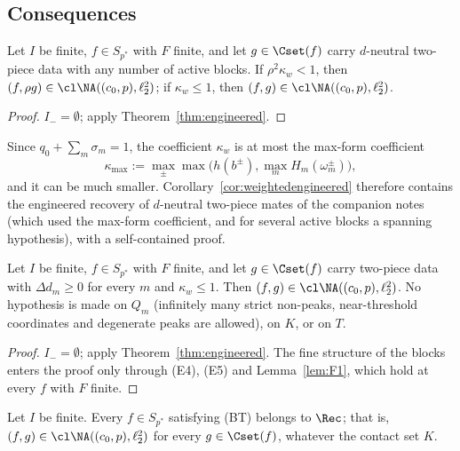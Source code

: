 
\subsection{Consequences}

\begin{corollary}\label{cor:weightedengineered}
Let $I$ be finite, $f\in S_{p^*}$ with $F$ finite, and let $g\in\Cset(f)$
carry $d$-neutral two-piece data with any number of active blocks.  If
$\rho^2\kappa_w<1$, then $(f,\rho g)\in\cl\NA((c_0,p),\ell_2^2)$; if
$\kappa_w\le1$, then $(f,g)\in\cl\NA((c_0,p),\ell_2^2)$.
\end{corollary}

\begin{proof}
$I_-=\emptyset$; apply Theorem~\ref{thm:engineered}.
\end{proof}

Since $q_0+\sum_m\sigma_m=1$, the coefficient $\kappa_w$ is at most the
max-form coefficient
\[
 \kappa_{\max}:=\max_\pm\max\big(h(b^\pm),\max_mH_m(\omega^\pm_m)\big),
\]
and it can be much smaller.  Corollary~\ref{cor:weightedengineered} therefore contains the
engineered recovery of $d$-neutral two-piece mates of the companion notes
(which used the max-form coefficient, and for several active blocks a
spanning hypothesis), with a self-contained proof.

\begin{corollary}\label{cor:D1}
Let $I$ be finite, $f\in S_{p^*}$ with $F$ finite, and let $g\in\Cset(f)$
carry two-piece data with $\Delta d_m\ge0$ for every $m$ and $\kappa_w\le1$.
Then $(f,g)\in\cl\NA((c_0,p),\ell_2^2)$.  No hypothesis is made on $Q_m$
\textup{(}infinitely many strict non-peaks, near-threshold coordinates and
degenerate peaks are allowed\textup{)}, on $K$, or on $T$.
\end{corollary}

\begin{proof}
$I_-=\emptyset$; apply Theorem~\ref{thm:engineered}.  The fine structure of
the blocks enters the proof only through (E4), (E5) and
Lemma~\ref{lem:F1}, which hold at every $f$ with $F$ finite.
\end{proof}

\begin{corollary}\label{cor:BTrecovered}
Let $I$ be finite.  Every $f\in S_{p^*}$ satisfying \textup{(BT)} belongs to
$\Rec$; that is, $(f,g)\in\cl\NA((c_0,p),\ell_2^2)$ for every
$g\in\Cset(f)$, whatever the contact set $K$.
\end{corollary}

